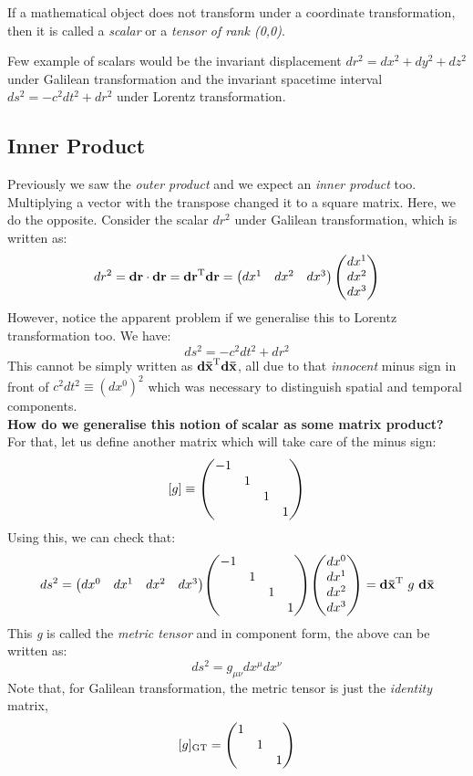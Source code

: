 \begin{definition}[Scalar]
    If a mathematical object does not transform under a coordinate transformation, then it is called a \textit{scalar} or a \textit{tensor of rank (0,0)}.
\end{definition}
Few example of scalars would be the invariant displacement $dr^2 = dx^2+dy^2+dz^2$ under Galilean transformation and the invariant spacetime interval $ds^2 = -c^2dt^2+dr^2$ under Lorentz transformation.
\subsection{Inner Product}
Previously we saw the \textit{outer product} and we expect an \textit{inner product} too. Multiplying a vector with the transpose changed it to a square matrix. Here, we do the opposite. Consider the scalar $dr^2$ under Galilean transformation, which is written as:
$$dr^2 = \vb{dr}\cdot\vb{dr}= \vb{dr}^{\mathrm{T}}\vb{dr} = \begin{pmatrix}
    dx^1 & dx^2 & dx^3
\end{pmatrix}\begin{pmatrix}
    dx^1 \\ dx^2 \\ dx^3
\end{pmatrix}$$
However, notice the apparent problem if we generalise this to Lorentz transformation too. We have:
$$ds^2 = -c^2dt^2 + dr^2$$
This cannot be simply written as $\vb{d\bar{x}}^{\mathrm{T}}\vb{d\bar{x}}$, all due to that \textit{innocent} minus sign in front of $c^2dt^2 \equiv (dx^0)^2$ which was necessary to distinguish spatial and temporal components. \\[0.2cm]
\textbf{How do we generalise this notion of scalar as some matrix product?}\\[0.2cm]
For that, let us define another matrix which will take care of the minus sign:
$$[g] \equiv \mqty(\dmat{-1,1,1,1})$$
Using this, we can check that:
$$ds^2 = \mqty(dx^0 & dx^1 & dx^2 & dx^3)\mqty(\dmat{-1,1,1,1})\mqty(dx^0 \\ dx^1 \\ dx^2 \\ dx^3) = \vb{d\bar{x}}^\mathrm{T}\ g\ \vb{d\bar{x}}$$
This \textit{g} is called the \textit{metric tensor} and in component form, the above can be written as:
$$ds^2 = g_{\mu\nu}dx^\mu dx^\nu$$
Note that, for Galilean transformation, the metric tensor is just the \textit{identity} matrix, 
$$[g]_{\mathrm{GT}} = \mqty(\dmat{1,1,1})$$